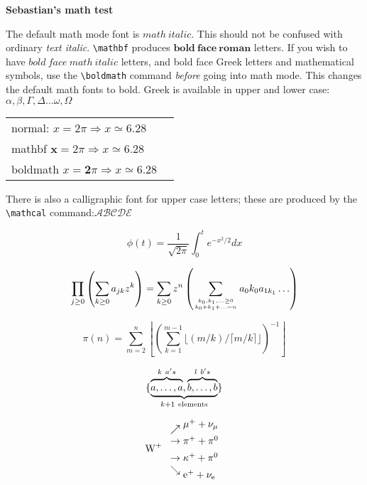 \documentclass{article}
\begin{document}
\begin{center}
\bf\Large Sebastian's math test
\end{center}
The default math mode font is $math\ italic$. This should not be
confused with ordinary \emph{text italic}.   
\verb|\mathbf| produces $\mathbf{bold\ face\ roman}$ letters. If you wish to have
{\boldmath $bold\ face\ math\ italic$} letters, and bold face Greek
letters and mathematical symbols, use the \verb|\boldmath| command
\emph{before} going into math mode.  This changes the default math
fonts to bold. Greek is available in upper and lower case:
\(\alpha,\beta, \Gamma, \Delta \dots \omega, \Omega\)
 
\begin{tabular}{ll}
normal: \( x = 2\pi \Rightarrow x \simeq 6.28 \)\\
mathbf \(\mathbf{x} = 2\pi \Rightarrow x \simeq 6.28 \)\\
boldmath {\boldmath \(x = \mathbf{2}\pi \Rightarrow x 
           \simeq{\mathbf{6.28}}              \)}\\
\end{tabular}
 
\noindent There is also a calligraphic font for upper case letters;
these are produced by the \verb|\mathcal| command:\( \mathcal{ABCDE} \)
 

\begin{equation}
  \phi(t)=\frac{1}{\sqrt{2\pi}}
  \int^t_0 e^{-x^2/2} dx 
\end{equation}

\begin{equation}
  \prod_{j\geq 0}
  \left(\sum_{k\geq 0}a_{jk} z^k\right) 
= \sum_{k\geq 0} z^n
  \left( \sum_{{k_0,k_1,\ldots\geq 0}
          \atop{k_0+k_1+\ldots=n}    }
        a{_0k_0}a_{1k_1}\ldots  \right) 
\end{equation}

\begin{equation}
\pi(n) = \sum_{m=2}^{n}
  \left\lfloor \left(\sum_{k=1}^{m-1}
       \lfloor(m/k)/\lceil m/k\rceil 
       \rfloor \right)^{-1}
  \right\rfloor
\end{equation}

\begin{equation}
\{\underbrace{%
    \overbrace{\mathstrut a,\ldots,a}^{k\ a's},
    \overbrace{\mathstrut b,\ldots,b}^{l\ b's}}
  _{k+1\ \mathrm{elements}}                   \}
\end{equation}

\begin{displaymath}
\mbox{W}^+\
\begin{array}{l}
\nearrow\raise5pt\hbox{$\mu^+ + \nu_{\mu}$}\\
\rightarrow         \pi^+ +\pi^0         \\[5pt]
\rightarrow \kappa^+ +\pi^0              \\
\searrow\lower5pt\hbox{$\mathrm{e}^+ 
          +\nu_{\scriptstyle\mathrm{e}}$}
\end{array}
\end{displaymath}
\end{document}
